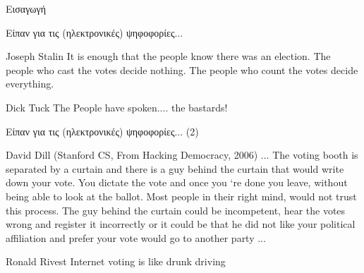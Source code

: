 \documentclass[handout]{beamer}
\begin{document}
\begin{section}{Εισαγωγή}

\begin{frame}{Είπαν για τις (ηλεκτρονικές) ψηφοφορίες...}

\begin{block}{Joseph Stalin}
It is enough that the people know there was an election. The people who cast the votes decide nothing. The people who count the votes decide everything.
\end{block}
\pause
\begin{block}{Dick Tuck}
The People have spoken.... the bastards!
\end{block}

\end{frame}

\begin{frame}{Είπαν για τις (ηλεκτρονικές) ψηφοφορίες... (2)}
\begin{block}{David Dill (Stanford CS, From Hacking Democracy, 2006)}
... The voting booth is separated by a curtain and there is a guy
behind the curtain that would write down your vote. You dictate the
vote and once you ‘re done you leave, without being able to look at 
the ballot. Most people in their right mind, would not trust this
process. The guy behind the curtain could be incompetent, hear the 
votes wrong and register it incorrectly or it could be that he did not
like your political affiliation and prefer your vote would go to
another party ...
\end{block}
\pause 
\begin{block}{Ronald Rivest}
Internet voting is like drunk driving
\end{block}

\end{frame}


\end{section}
\end{document}
